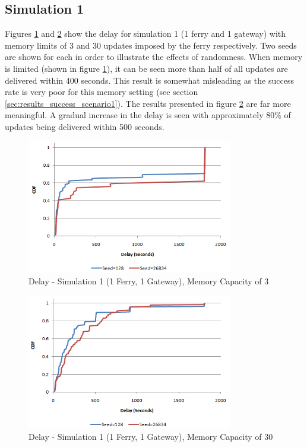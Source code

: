 \subsection{Simulation 1}

Figures \ref{fig:result_delay_sim1byseed_mc3} and \ref{fig:result_delay_sim1byseed_mc30} show the delay for simulation 1 (1 ferry and 1 gateway) with memory limits of 3 and 30 updates imposed by the ferry respectively.
Two seeds are shown for each in order to illustrate the effects of randomness.
When memory is limited (shown in figure \ref{fig:result_delay_sim1byseed_mc3}), it can be seen more than half of all updates are delivered within 400 seconds. 
This result is somewhat misleading as the success rate is very poor for this memory setting (see section \ref{sec:results_success_scenario1}).
The results presented in figure \ref{fig:result_delay_sim1byseed_mc30} are far more meaningful.
A gradual increase in the delay is seen with approximately 80\% of updates being delivered within 500 seconds.

\begin{figure}[htbp]
    \centering
    \includegraphics[width=0.8\textwidth]{images/result_delay_sim1byseed_mc3}
    \caption{Delay - Simulation 1 (1 Ferry, 1 Gateway), Memory Capacity of 3}
    \label{fig:result_delay_sim1byseed_mc3}
\end{figure}

\begin{figure}[htbp]
    \centering
    \includegraphics[width=0.8\textwidth]{images/result_delay_sim1byseed_mc30}
    \caption{Delay - Simulation 1 (1 Ferry, 1 Gateway), Memory Capacity of 30}
    \label{fig:result_delay_sim1byseed_mc30}
\end{figure}

